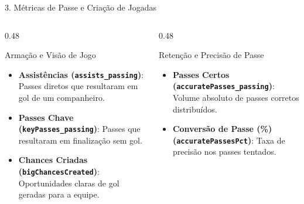 \documentclass[aspectratio=169, 10pt]{beamer}
\begin{document}
\begin{frame}{3. Métricas de Passe e Criação de Jogadas}
  \begin{columns}
    \begin{column}{0.48\textwidth}
      \begin{block}{Armação e Visão de Jogo}
        \begin{itemize}
          \item \textbf{Assistências (\texttt{assists\_passing})}: Passes diretos que resultaram em gol de um companheiro.
          \item \textbf{Passes Chave (\texttt{keyPasses\_passing})}: Passes que resultaram em finalização sem gol.
          \item \textbf{Chances Criadas (\texttt{bigChancesCreated})}: Oportunidades claras de gol geradas para a equipe.
        \end{itemize}
      \end{block}
    \end{column}
    \begin{column}{0.48\textwidth}
      \begin{block}{Retenção e Precisão de Passe}
        \begin{itemize}
          \item \textbf{Passes Certos (\texttt{accuratePasses\_passing})}: Volume absoluto de passes corretos distribuídos.
          \item \textbf{Conversão de Passe (\%) (\texttt{accuratePassesPct})}: Taxa de precisão nos passes tentados.
        \end{itemize}
      \end{block}
    \end{column}
  \end{columns}
\end{frame}
\end{document}
